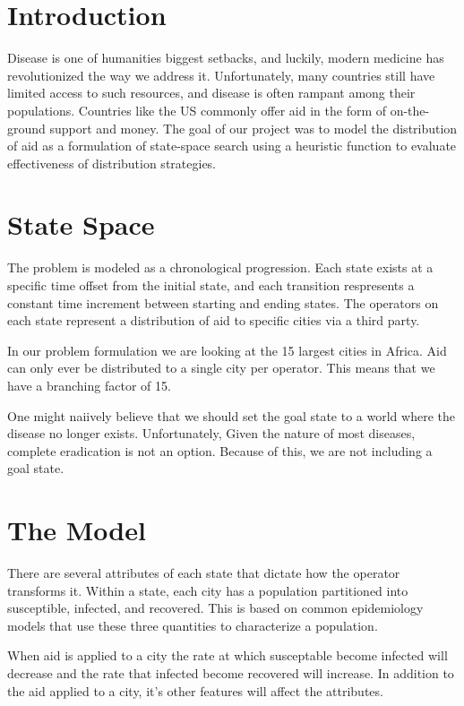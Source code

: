 \documentclass[12pt]{article}
\begin{document}
\maketitle

\section*{Introduction}
Disease is one of humanities biggest setbacks, and luckily, modern medicine
has revolutionized the way we address it. Unfortunately, many countries still
have limited access to such resources, and disease is often rampant among their
populations. Countries like the US commonly offer aid in the form of
on-the-ground support and money. The goal of our project was to model the
distribution of aid as a formulation of state-space search using a heuristic
function to evaluate effectiveness of distribution strategies. 

\section*{State Space}
The problem is modeled as a chronological progression. Each state exists at a
specific time offset from the initial state, and each transition respresents a
constant time increment between starting and ending states. The operators on
each state represent a distribution of aid to specific cities via a third party.

In our problem formulation we are looking at the 15 largest cities in Africa.
Aid can only ever be distributed to a single city per operator. This means
that we have a branching factor of 15.

One might naiively believe that we should set the goal state to a world where the
disease no longer exists. Unfortunately, Given the nature of most diseases, complete eradication
is not an option. Because of this, we are not including a goal state.

\section*{The Model}
There are several attributes of each state that dictate how the operator
transforms it. Within a state, each city has a population partitioned into
susceptible, infected, and recovered. This is based on common epidemiology
models that use these three quantities to characterize a population.

When aid is applied to a city the rate at which susceptable become infected
will decrease and the rate that infected become recovered will increase. In
addition to the aid applied to a city, it's other features will affect the
attributes.
\end{document}
